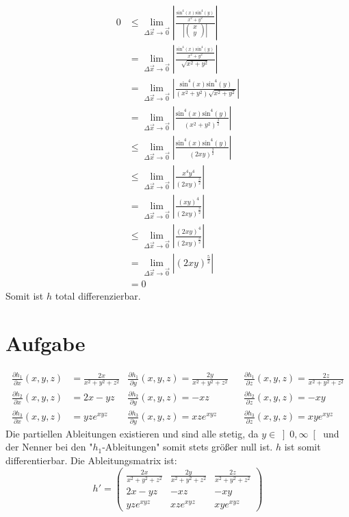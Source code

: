 \documentclass[10pt,a4paper,parskip=half]{scrartcl}
\begin{document}
\begin{enumerate}[(i)]
\begin{align*}
0 &\le\lim_{\Delta \vec x \to \vec 0} \left|\frac{\frac{\text{sin}^4(x)\text{sin}^4(y)}{x^2 + y^2}}{\left|\begin{pmatrix}x\\y\end{pmatrix} \right|}\right| \\
&= \lim_{\Delta \vec x \to \vec 0} \left|\frac{\frac{\text{sin}^4(x)\text{sin}^4(y)}{x^2 + y^2}}{\sqrt{x^2+y^2}}\right| \\
&= \lim_{\Delta \vec x \to \vec 0} \left|\frac{\text{sin}^4(x)\text{sin}^4(y)}{(x^2 + y^2)\sqrt{x^2+y^2}}\right| \\
&= \lim_{\Delta \vec x \to \vec 0} \left|\frac{\text{sin}^4(x)\text{sin}^4(y)}{(x^2 + y^2)^{\frac{3}{2}}}\right| \\
&\le \lim_{\Delta \vec x \to \vec 0} \left|\frac{\text{sin}^4(x)\text{sin}^4(y)}{(2xy)^{\frac{3}{2}}}\right| \\
&\le \lim_{\Delta \vec x \to \vec 0} \left|\frac{x^4y^4}{(2xy)^{\frac{3}{2}}}\right| \\
&= \lim_{\Delta \vec x \to \vec 0} \left|\frac{(xy)^4}{(2xy)^{\frac{3}{2}}}\right| \\
&\le \lim_{\Delta \vec x \to \vec 0} \left|\frac{(2xy)^4}{(2xy)^{\frac{3}{2}}}\right| \\
&= \lim_{\Delta \vec x \to \vec 0} \left|(2xy)^{\frac{5}{2}}\right| \\
&= 0
\end{align*}
Somit ist $h$ total differenzierbar.

\section{Aufgabe}
\begin{align*}
\frac{\partial h_1}{\partial x}(x,y,z) &= \frac {2x}{x^2+y^2+z^2} &\frac{\partial h_1}{\partial y}(x,y,z) = \frac{2y}{x^2+y^2+z^2} &&\frac{\partial h_1}{\partial z}(x,y,z) = \frac{2z}{x^2+y^2+z^2}\\
\frac{\partial h_2}{\partial x}(x,y,z) &= 2x-yz &\frac{\partial h_2}{\partial y}(x,y,z) = -xz &&\frac{\partial h_2}{\partial z}(x,y,z) = -xy\\
\frac{\partial h_3}{\partial x}(x,y,z) &= yze^{xyz} &\frac{\partial h_3}{\partial y}(x,y,z) = xze^{xyz} &&\frac{\partial h_3}{\partial z}(x,y,z) = xye^{xyz}
\end{align*}
Die partiellen Ableitungen existieren und sind alle stetig, da $y \in \left]0,\infty\right[$ und der Nenner bei den "$h_1$-Ableitungen" somit stets größer null ist. $h$ ist somit differentierbar.
Die Ableitungsmatrix ist:
$$h' =\begin{pmatrix}
\frac{2x}{x^2 + y^2 + z^2} & \frac{2y}{x^2 + y^2 + z^2} & \frac{2z}{x^2 + y^2 + z^2} \\
2x - yz & -xz & -xy \\
yze^{xyz}  & xze^{xyz} & xye^{xyz} 
\end{pmatrix}  $$


\end{enumerate}
\end{document}
